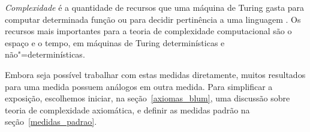 \emph{Complexidade} é a quantidade de recursos
que uma máquina de Turing gasta
para computar determinada função
ou para decidir pertinência a uma linguagem
\cite[p.~285]{HopcroftUllman1979}.
Os recursos mais importantes para a teoria de complexidade computacional
são o espaço e o tempo,
em máquinas de Turing determinísticas e não"=determinísticas.

Embora seja possível trabalhar com estas medidas diretamente,
muitos resultados para uma medida
possuem análogos em outra medida.
Para simplificar a exposição,
escolhemos iniciar,
na seção~\ref{axiomas_blum},
uma discussão sobre teoria de complexidade axiomática,
e definir as medidas padrão na seção~\ref{medidas_padrao}.
